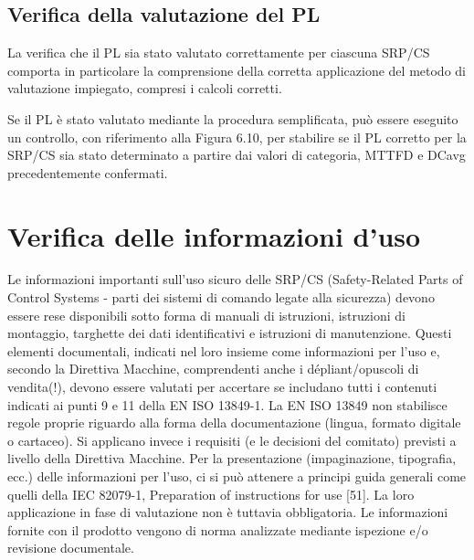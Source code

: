 \subsection{Verifica della valutazione del PL}
\label{subsec:07-4-7}
La verifica che il PL sia stato valutato correttamente per ciascuna SRP/CS comporta in particolare la comprensione della corretta applicazione del metodo di valutazione impiegato, compresi i calcoli corretti.

Se il PL è stato valutato mediante la procedura semplificata, può essere eseguito un controllo, con riferimento alla Figura 6.10, per stabilire se il PL corretto per la SRP/CS sia stato determinato a partire dai valori di categoria, MTTFD e DCavg precedentemente confermati.

\section{Verifica delle informazioni d’uso}
\label{sec:07-5}
Le informazioni importanti sull'uso sicuro delle SRP/CS (Safety-Related Parts of Control Systems - parti dei sistemi di comando legate alla sicurezza) devono essere rese disponibili sotto forma di manuali di istruzioni, istruzioni di montaggio, targhette dei dati identificativi e istruzioni di manutenzione. Questi elementi documentali, indicati nel loro insieme come informazioni per l'uso e, secondo la Direttiva Macchine, comprendenti anche i dépliant/opuscoli di vendita(!), devono essere valutati per accertare se includano tutti i contenuti indicati ai punti 9 e 11 della EN ISO 13849-1. La EN ISO 13849 non stabilisce regole proprie riguardo alla forma della documentazione (lingua, formato digitale o cartaceo). Si applicano invece i requisiti (e le decisioni del comitato) previsti a livello della Direttiva Macchine. Per la presentazione (impaginazione, tipografia, ecc.) delle informazioni per l'uso, ci si può attenere a principi guida generali come quelli della IEC 82079-1, Preparation of instructions for use [51]. La loro applicazione in fase di valutazione non è tuttavia obbligatoria. Le informazioni fornite con il prodotto vengono di norma analizzate mediante ispezione e/o revisione documentale.

